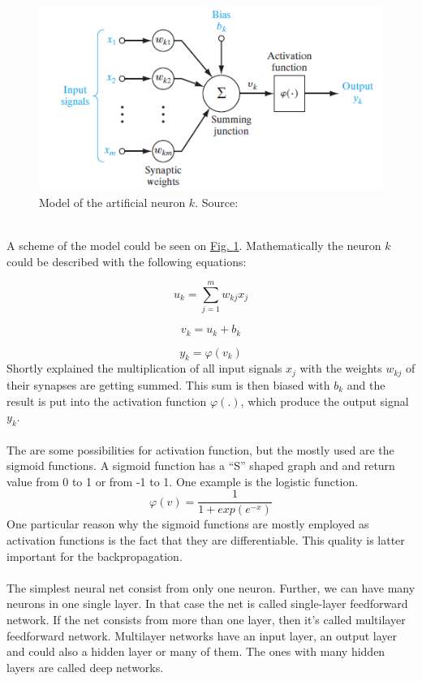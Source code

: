 \documentclass[runningheads,a4paper]{llncs}[2015/06/24]
\begin{document}
\begin{figure}[h]
\centering
\includegraphics[width=\textwidth]{neuronModel}
\caption{Model of the artificial neuron $k$. Source: \cite{haykin2009neural}}
\label{fig:neuronModel}
\end{figure}

\hspace{1cm}\\ A scheme of the model could be seen on \hyperref[fig:neuronModel]{Fig. \ref{fig:neuronModel}}. Mathematically the neuron $k$ could be described with the following equations:

\begin{equation}
u_k = \sum_{j=1}^{m} w_{kj}x_j
\end{equation}

\begin{equation}
v_k = u_k + b_k
\end{equation}

\begin{equation}
y_k = φ(v_k)
\end{equation}Shortly explained the multiplication of all input signals $x_j$ with the weights $w_{kj}$ of their synapses are getting summed. This sum is then biased with $b_k$ and the result is put into the activation function $φ(.)$, which produce the output signal $y_k$.\\\\
The are some possibilities for activation function, but the mostly used are the sigmoid functions. A sigmoid function has a \enquote{S} shaped graph and and return value from 0 to 1 or from -1 to 1. One example is the logistic function.
\begin{equation}
φ(v) = \frac{1}{1 + exp(e^{-x})}
\end{equation}
One particular reason why the sigmoid functions are mostly employed as activation functions is the fact that they are differentiable. This quality is latter important for the backpropagation. \\\\The simplest neural net consist from only one neuron. Further, we can have many neurons in one single layer. In that  case the net is called single-layer feedforward network. If the net consists from more than one layer, then it's called multilayer feedforward network. Multilayer networks have an input layer, an output layer and could also a hidden layer or many of them. The ones with many hidden layers are called deep networks\cite{haykin2009neural}.
\end{document}
